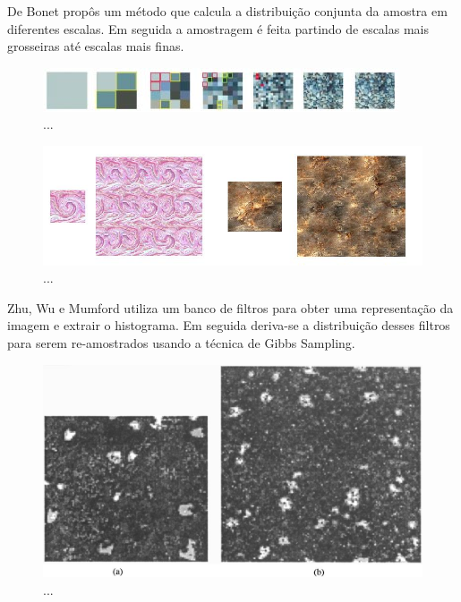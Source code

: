 
De Bonet \cite{Bonet1997} propôs
um método que calcula a distribuição
conjunta da amostra em diferentes
escalas. Em seguida a amostragem
é feita partindo de escalas mais
grosseiras até escalas mais finas.

\begin{figure}[!ht]
	\includegraphics[width=\linewidth]{files/assets/articles/bonet2.png}
	\caption{...}
	\label{img:preview}
\end{figure}
\begin{figure}[!ht]
	\includegraphics[width=\linewidth]{files/assets/articles/bonet.png}
	\caption{...}
	\label{img:preview}
\end{figure}

Zhu, Wu e Mumford \cite{Zhu1998}
utiliza um banco de filtros para
obter uma representação da imagem
e extrair o histograma.
Em seguida deriva-se a distribuição
desses filtros para serem re-amostrados
usando a técnica de Gibbs Sampling.

\begin{figure}[!ht]
	\centering
	\includegraphics[width=\linewidth*2/3]{files/assets/articles/zhu.png}
	\caption{...}
	\label{img:preview}
\end{figure}


